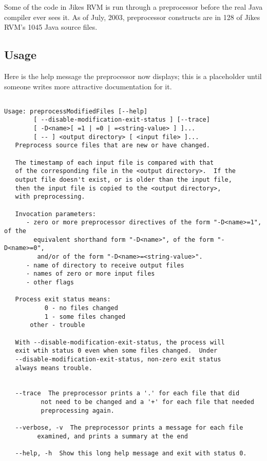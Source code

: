 Some of the code in Jikes RVM is run through a preprocessor before the
real Java compiler ever sees it.  As of July, 2003, preprocessor
constructs are in 128 of Jikes RVM's 1045 Java source files.

\subsection{Usage}

Here is the help message the preprocessor now displays; this
is a placeholder until someone writes more attractive documentation
for it.

\begin{verbatim}

Usage: preprocessModifiedFiles [--help]
        [ --disable-modification-exit-status ] [--trace]
        [ -D<name>[ =1 | =0 | =<string-value> ] ]... 
        [ -- ] <output directory> [ <input file> ]...
   Preprocess source files that are new or have changed.

   The timestamp of each input file is compared with that
   of the corresponding file in the <output directory>.  If the
   output file doesn't exist, or is older than the input file,
   then the input file is copied to the <output directory>, 
   with preprocessing.

   Invocation parameters:
      - zero or more preprocessor directives of the form "-D<name>=1", of the
        equivalent shorthand form "-D<name>", of the form "-D<name>=0",
         and/or of the form "-D<name>=<string-value>".
      - name of directory to receive output files
      - names of zero or more input files
      - other flags

   Process exit status means:
           0 - no files changed
           1 - some files changed
       other - trouble

   With --disable-modification-exit-status, the process will
   exit wtih status 0 even when some files changed.  Under
   --disable-modification-exit-status, non-zero exit status
   always means trouble.


   --trace  The preprocessor prints a '.' for each file that did
          not need to be changed and a '+' for each file that needed
          preprocessing again.

   --verbose, -v  The preprocessor prints a message for each file
         examined, and prints a summary at the end 

   --help, -h  Show this long help message and exit with status 0.


\end{verbatim}
